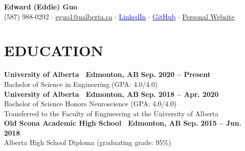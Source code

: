 \documentclass{article}
\begin{document}
\thispagestyle{plain}
\begin{center}
    \LARGE \textbf{\textcolor{my_colour}{Edward (Eddie) Guo}}\\ \vspace{0.25em}
    \normalfont \normalsize (587) 988-0292 \hspace{.25em} $\boldsymbol{\cdot}$ \hspace{.25em} \href{mailto:eguo1@ualberta.ca}{eguo1@ualberta.ca} \hspace{.25em} $\boldsymbol{\cdot}$ \hspace{.25em} \href{https://www.linkedin.com/in/eguo1}{\textcolor{blue}{LinkedIn}} \hspace{.25em} $\boldsymbol{\cdot}$ \hspace{.25em} \href{https://github.com/tig3r66}{\textcolor{blue}{GitHub}} \hspace{.25em} $\boldsymbol{\cdot}$ \hspace{.25em} \href{https://tig3r66.github.io/index.html}{Personal Website}
\end{center}

\section*{\textcolor{my_colour}{EDUCATION}}
\vspace{-.25em} \hrulefill \vspace{.75em}

    \textbf{University of Alberta \textbar\ Edmonton, AB} \hfill \textbf{Sep. 2020 -- Present}\\
    Bachelor of Science in Engineering (GPA: 4.0/4.0)\\

    \textbf{University of Alberta \textbar\ Edmonton, AB} \hfill \textbf{Sep. 2018 -- Apr. 2020}\\
    Bachelor of Science Honors Neuroscience (GPA: 4.0/4.0)\\
    Transferred to the Faculty of Engineering at the University of Alberta\\

    \textbf{Old Scona Academic High School \textbar\ Edmonton, AB} \hfill \textbf{Sep. 2015 -- Jun. 2018}\\
    Alberta High School Diploma (graduating grade: 95\%)


\end{document}
